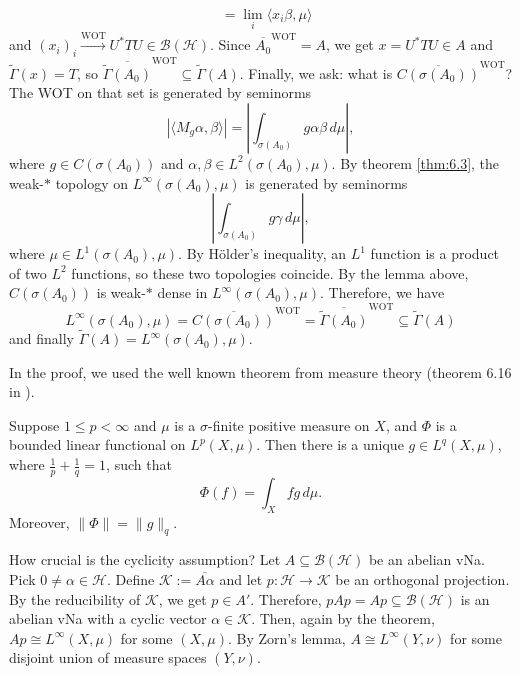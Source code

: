 \begin{myproof}
\begin{align*}
    &= \lim_i \langle x_i \beta, \mu \rangle
  \end{align*} 
  and $(x_i)_i \xrightarrow{\mathrm{WOT}} U^* T U \in \mathcal{B}(\mathcal{H})$. Since $\overline{A_0}^{\mathrm{WOT}} = A$, we get $x = U^* T U \in A$ and $\widetilde{\Gamma}(x) = T$, so $\overline{\widetilde{\Gamma} (A_0)}^{\mathrm{WOT}} \subseteq \widetilde{\Gamma} (A)$.
  Finally, we ask: what is $\overline{C(\sigma(A_0))}^{\mathrm{WOT}}$? The WOT on that set is generated by seminorms 
  $$ |\langle M_g \alpha, \beta \rangle| = \left| \int_{\sigma(A_0)} g \alpha \beta\, d\mu \right|, $$
  where $g \in C(\sigma(A_0))$ and $\alpha, \beta \in L^2 (\sigma(A_0), \mu)$. By theorem \ref{thm:6.3}, the weak-$*$ topology on $L^\infty (\sigma(A_0), \mu)$ is generated by seminorms 
  $$ \left| \int_{\sigma(A_0)} g \gamma\, d\mu \right|, $$
  where $\mu \in L^1 (\sigma(A_0), \mu)$. By Hölder's inequality, an $L^1$ function is a product of two $L^2$ functions, so these two topologies coincide.
  By the lemma above, $C(\sigma(A_0))$ is weak-$*$ dense in $L^\infty (\sigma(A_0), \mu)$. Therefore, we have 
  $$ L^\infty (\sigma(A_0), \mu) = \overline{C(\sigma(A_0))}^{\mathrm{WOT}} = \overline{\widetilde{\Gamma} (A_0)}^{\mathrm{WOT}} \subseteq \widetilde{\Gamma} (A) $$
  and finally $\widetilde{\Gamma} (A) = L^\infty (\sigma(A_0), \mu)$.
\end{myproof}

In the proof, we used the well known theorem from measure theory (theorem 6.16 in \cite{rudin}).

\begin{theorem}\label{thm:6.3}
  Suppose $1 \leq p < \infty$ and $\mu$ is a $\sigma$-finite positive measure on $X$,
  and $\Phi$ is a bounded linear functional on $L^p(X, \mu)$.
  Then there is a unique $g \in L^q(X, \mu)$, where $\frac{1}{p} + \frac{1}{q} = 1$, such that 
  $$\Phi(f) = \int_X f g\, d\mu.$$ Moreover, $\|\Phi\| = \|g\|_q$.
\end{theorem}

How crucial is the cyclicity assumption?
Let $A \subseteq \mathcal{B}(\mathcal{H})$ be an abelian vNa. Pick $0 \neq \alpha \in \mathcal{H}$.
Define $\mathcal{K} := \overline{A \alpha}$ and let $p: \mathcal{H} \to \mathcal{K}$ be an orthogonal 
projection. By the reducibility of $\mathcal{K}$, we get $p \in A'$. Therefore, $p A p = A p \subseteq \mathcal{B}(\mathcal{H})$
is an abelian vNa with a cyclic vector $\alpha \in \mathcal{K}$.
Then, again by the theorem, $A p \cong L^\infty(X, \mu)$ for some $(X, \mu)$.
By Zorn's lemma, $A \cong L^\infty(Y, \nu)$ for some disjoint union of measure spaces $(Y, \nu)$.

